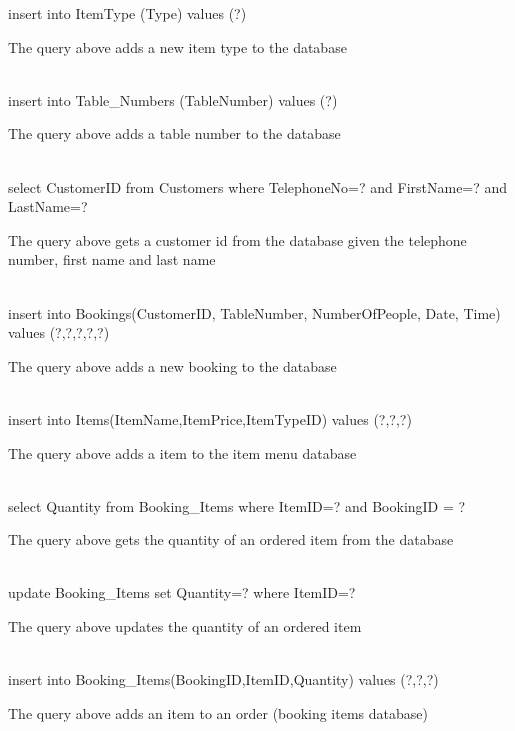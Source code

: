 \begin{sql}
insert into ItemType (Type) values (?)
\end{sql}
The query above adds a new item type to the database \\ \\

\begin{sql}
insert into Table_Numbers (TableNumber) values (?)
\end{sql}
The query above adds a table number to the database \\ \\

\begin{sql}
select CustomerID from Customers where TelephoneNo=? and FirstName=? and LastName=?
\end{sql}
The query above gets a customer id from the database given the telephone number, first name and last name \\ \\

\begin{sql}
insert into Bookings(CustomerID, TableNumber, NumberOfPeople, Date, Time) values (?,?,?,?,?)
\end{sql}
The query above adds a new booking to the database \\ \\

\begin{sql}
insert into Items(ItemName,ItemPrice,ItemTypeID) values (?,?,?)
\end{sql}
The query above adds a item to the item menu database \\ \\


\begin{sql}
select Quantity from Booking_Items where ItemID=? and BookingID = ?
\end{sql}
The query above gets the quantity of an ordered item from the database  \\ \\


\begin{sql}
update Booking_Items set Quantity=? where ItemID=?
\end{sql}
The query above updates the quantity of an ordered item \\ \\


\begin{sql}
insert into Booking_Items(BookingID,ItemID,Quantity) values (?,?,?)
\end{sql}
The query above adds an item to an order (booking items database) \\ \\


